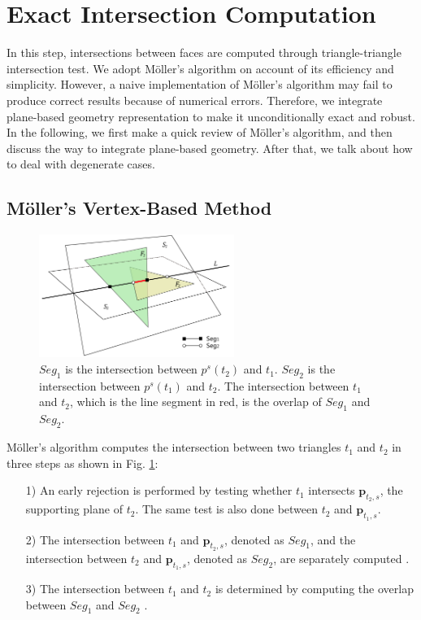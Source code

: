 \documentclass[10pt,journal,compsoc]{IEEEtran}
\begin{document}
\section{Exact Intersection Computation}

\label{section:isect}
In this step, intersections between faces are computed through triangle-triangle intersection test. We adopt M\"{o}ller's algorithm \cite{moller1997fast} on account of its efficiency and simplicity. However, a naive implementation of M\"{o}ller's algorithm may fail to produce correct results because of numerical errors. Therefore, we integrate plane-based geometry representation to make it unconditionally exact and robust. In the following, we first make a quick review of M\"{o}ller's algorithm, and then discuss the way to integrate plane-based geometry. After that, we talk about how to deal with degenerate cases.

\subsection{M\"{o}ller's Vertex-Based Method}

\begin{figure}[t]
\centering
\includegraphics[width=2.5in]{projection}
\caption{$Seg_1$ is the intersection between $p^s(t_2)$ and $t_1$. $Seg_2$ is the intersection between $p^s(t_1)$ and $t_2$. The intersection between $t_1$ and $t_2$, which is the line segment in red, is the overlap of $Seg_1$ and $Seg_2$.}
\label{fig_projection}
\end{figure}


M\"{o}ller's algorithm computes the intersection between two triangles $t_1$ and $t_2$ in three steps as shown in Fig. \ref{fig_projection}:
\begin{itemize}[leftmargin=0.45cm]
\item[1)] An early rejection is performed by testing whether $t_1$ intersects $\bm{p}_{t_2, s}$, the supporting plane of $t_2$. The same test is also done between $t_2$ and $\bm{p}_{t_1, s}$.
\item[2)]The intersection between $t_1$ and $\bm{p}_{t_2, s}$, denoted as $Seg_1$, and the intersection between $t_2$ and $\bm{p}_{t_1, s}$, denoted as $Seg_2$, are separately computed .
 \item[3)]The intersection between $t_1$ and $t_2$ is determined by computing the overlap between $Seg_1$ and $Seg_2$ .
\end{itemize}
\end{document}
